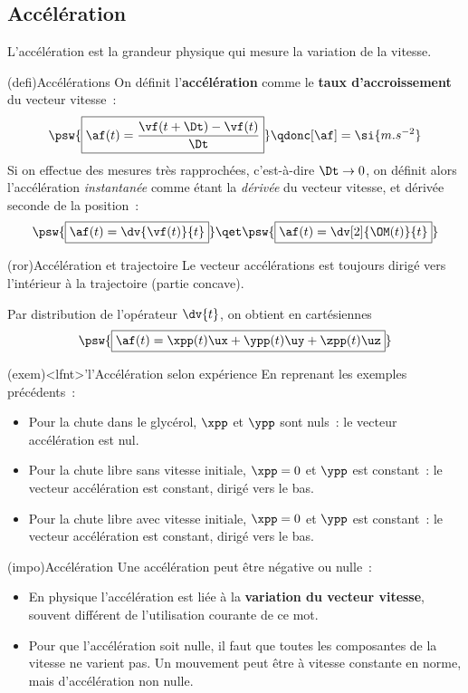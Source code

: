 \documentclass[../../main/main.tex]{subfiles}
\begin{document}
\subsection{Accélération}
L'accélération est la grandeur physique qui mesure la variation de la vitesse.
\begin{tcb*}(defi){Accélérations}
	On définit l'\textbf{accélération} comme le \textbf{taux d'accroissement} du
	vecteur vitesse~:
	\[\psw{\boxed{\af(t) = \frac{\vf(t+\Dt) - \vf(t)}{\Dt}}}
		\qdonc
		[\af] = \si{m.s^{-2}}\]
	Si on effectue des mesures très rapprochées, c'est-à-dire $\Dt \rightarrow
		0$, on définit alors l'accélération \textit{instantanée} comme étant la
	\textit{dérivée} du vecteur vitesse, et dérivée seconde de la position~:
	\[\psw{\boxed{\af(t) = \dv{\vf(t)}{t}}}
		\qet
		\psw{\boxed{\af(t) = \dv[2]{\OM(t)}{t}}}\]
\end{tcb*}

\begin{tcb*}(ror){Accélération et trajectoire}
	Le vecteur accélérations est toujours dirigé vers l'intérieur à la
	trajectoire (partie concave).
\end{tcb*}

Par distribution de l'opérateur $\dv{t}$, on obtient en cartésiennes
\[\psw{\boxed{\af(t) = \xpp(t)\ux + \ypp(t)\uy + \zpp(t)\uz}}\]

\begin{tcb*}(exem)<lfnt>'l'{Accélération selon expérience}
	En reprenant les exemples précédents~:
	\begin{itemize}
		\item Pour la chute dans le glycérol, $\xpp$ et $\ypp$ sont nuls~: le
		      vecteur accélération est nul.
		\item Pour la chute libre sans vitesse initiale, $\xpp = 0$ et $\ypp$
		      est constant~: le vecteur accélération est constant, dirigé vers le
		      bas.
		\item Pour la chute libre avec vitesse initiale, $\xpp = 0$ et $\ypp$
		      est constant~: le vecteur accélération est constant, dirigé vers le
		      bas.
	\end{itemize}
\end{tcb*}

\begin{tcb*}(impo){Accélération}
	Une accélération peut être négative ou nulle~:
	\begin{itemize}
		\item En physique l'accélération est liée à la \textbf{variation du
			      vecteur vitesse}, souvent différent de l'utilisation courante de ce
		      mot.
		\item Pour que l'accélération soit nulle, il faut que toutes les
		      composantes de la vitesse ne varient pas. Un mouvement peut être à
		      vitesse constante en norme, mais d'accélération non nulle.
	\end{itemize}
\end{tcb*}
\end{document}
